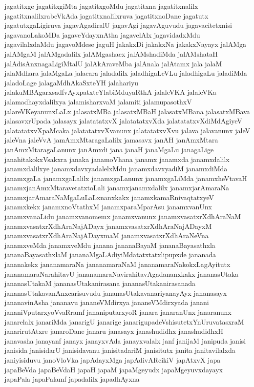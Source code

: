 {jagatitxge
jagatitxgiMta
jagatitxgoMdu
jagatitxna
jagatitxnalilx
jagatitxnalilxrabeVkAda
jagatitxnalilxruva
jagatitxnoDane
jagatutx
jagatutxgaLigiruva
jagavAgadiralU
jagavAgi
jagavAguvudu
jagavacitetxnisi
jagavanoLakoMDa
jagaveYdayxnAtha
jagavelAlx
jagavidadxMdu
jagavilalxdaMdu
jagavoMdese
jaguH
jakakxDi
jakakxNa
jakakxNayayx
jalAMga
jalAMgaM
jalAMgadalilx
jalAMgashacx
jalAMshadiMda
jalAMshataH
jalAdisAnxnagaLigiMtalU
jalAkAraveMba
jalAnala
jalAtamx
jala
jalaM
jalaMdhara
jalaMgaLa
jalacara
jaladalilx
jaladhigaLeVLu
jaladhigaLu
jaladiMda
jaladoLage
jalagaMdhAkaSxteYH
jalahariyu
jalakuMBAgarxsadfvAyxpatxteYlabiMduyaRthA
jalaleVKA
jalaleVKa
jalamadhayxdalilxya
jalamisharxvaM
jalamiti
jalamupasothxV
jalareVKeyanunxLaLx
jalasatxMBa
jalasatxMBaH
jalasatxMBana
jalasatxMBava
jalasavxrUpada
jalasayx
jalatatatxvX
jalatatatxvXda
jalatatatxvXdiMdAgiyeV
jalatatatxvXpaMcaka
jalatatatxvXvanunx
jalatatatxvXvu
jalava
jalavanunx
jaleV
jaleVna
jaleVvA
jamAmxMtaragaLalilx
jamasavx
janAH
janAmxMtara
janAmxMtaragaLanunx
janAmxdi
jana
janaH
janaMgaLu
janagaLige
janahitakokxVsakxra
janaka
janamoVhana
janamx
janamxda
janamxdalilx
janamxdalilxye
janamxdavxyadalelxMdu
janamxdavxyadiM
janamxdiMda
janamxgaLa
janamxgaLalilx
janamxgaLanunx
janamxgaLiMda
janamxheVtavaH
janamxjanAmxMtaravetatxtoLali
janamxjanamxdalilx
janamxjarAmaraNa
janamxjarAmaraNaMgaLuLaLxnanxkakx
janamxkamaRnivaqtatxyeV
janamxkekx
janamxnoVtathxM
janamxparaMparAsu
janamxvanUnx
janamxvanaLidu
janamxvanomemx
janamxvanunx
janamxvasatxrXdhAraNaM
janamxvasatxrXdhAraNajADayx
janamxvasatxrXdhAraNajADayxM
janamxvasatxrXdhAraNajADayxmaM
janamxvasatxrXdhAraNeVna
janamxveMda
janamxveMdu
janana
jananaBayaM
jananaBayasathxla
jananaBayasathxlaM
jananaMgaLAdiyiMdatatxtatxlipupxde
jananada
jananakekx
jananamaraNa
jananamaraNaM
jananamaraNakokxLagAyitutx
jananamaraNarahitavU
jananamaraNavirahitavAgadananxkakx
jananasUtaka
jananasUtakaM
jananasUtakanirasana
jananasUtakanirasanada
jananasUtakavanAnxcarisuvudu
jananasUtakavanariyanayAyx
jananasayx
jananavinAsha
jananavu
jananeVMdirxya
jananeVMdirxyada
janani
jananiVputarxyoVvaRramf
jananiputarxyoR
janara
janaranUnx
janaranunx
janarelalx
janariMda
janarigU
janarige
janarigupadeVshisutetxYnUruvatasxraM
janarirutAtxre
janaroDane
janaru
janasayx
janashudidhx
janashudidhxH
janavasha
janayanf
janayx
janayxvAda
janayxvalalx
janf
janijaM
janipuda
janisi
janisida
janisidarU
janisidavanu
janisitadariM
janisitutx
janita
janitavilalxda
janiyisiduvu
janoVloVka
japAdayxMga
japAdivARcikiV
japAtxvX
japa
japaBeVda
japaBeVdaH
japaH
japaM
japaMgeyudx
japaMgeyuvxdayayx
japaPala
japaPalamf
japadalilx
japadhAyxna
}
